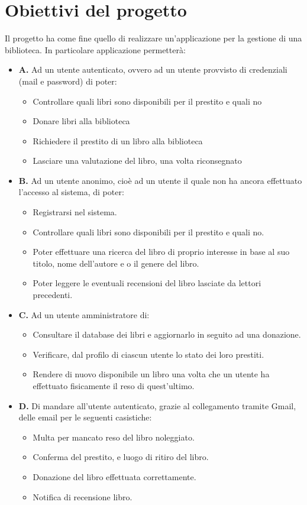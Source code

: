 \documentclass{article}
\begin{document}
\section{Obiettivi del progetto}
Il progetto ha come fine quello di realizzare un’applicazione per la gestione di una biblioteca. In particolare applicazione permetterà:
\begin{itemize}
    \item \textbf{A.} Ad un utente autenticato, ovvero ad un utente provvisto di credenziali (mail e password) di poter:
        \begin{itemize}
            \item Controllare quali libri sono disponibili per il prestito e quali no
            \item Donare libri alla biblioteca
            \item Richiedere il prestito di un libro alla biblioteca
            \item Lasciare una valutazione del libro, una volta riconsegnato
        \end{itemize} 
    \item \textbf{B.} Ad un utente anonimo, cioè ad un utente il quale non ha ancora effettuato l’accesso al sistema, di poter:
        \begin{itemize}
            \item Registrarsi nel sistema.
            \item Controllare quali libri sono disponibili per il prestito e quali no.
            \item Poter effettuare una ricerca del libro di proprio interesse in base al suo titolo, nome dell'autore e o il genere del libro.
            \item Poter leggere le eventuali recensioni del libro lasciate da lettori precedenti.
            \end{itemize}
    \item \textbf{C.} Ad un utente amministratore di:
        \begin{itemize}
            \item Consultare il database dei libri e aggiornarlo in seguito ad una donazione.
            \item Verificare, dal profilo di ciascun utente lo stato dei loro prestiti.
            \item Rendere di nuovo disponibile un libro una volta che un utente ha effettuato fisicamente il reso di quest'ultimo.
        \end{itemize}
    \item \textbf{D.} Di mandare all’utente autenticato, grazie al collegamento tramite Gmail, delle email per le seguenti casistiche:
        \begin{itemize}
            \item Multa per mancato reso del libro noleggiato.
            \item Conferma del prestito, e luogo di ritiro del libro.
            \item Donazione del libro effettuata correttamente.
            \item  Notifica di recensione libro.
            \end{itemize}
\end{itemize}
\end{document}
